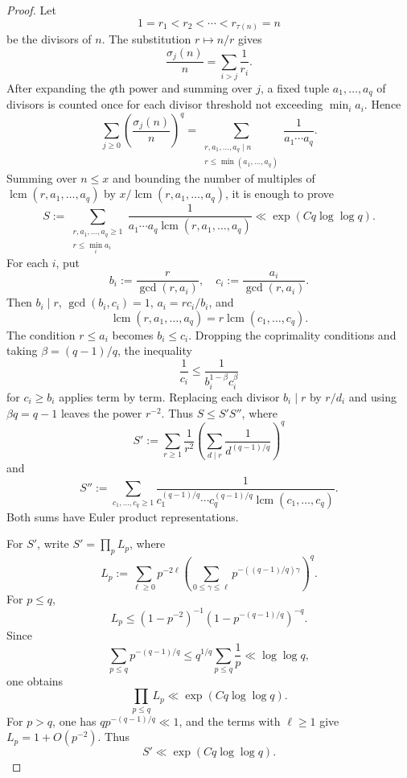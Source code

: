 \documentclass[11pt,letterpaper,reqno]{amsart}
\numberwithin{equation}{section}
\theoremstyle{remark}
\DeclareMathOperator{\lcm}{lcm}
\renewcommand{\leq}{\leqslant}
\renewcommand{\geq}{\geqslant}
\begin{document}
\begin{proof}
Let
\[
 1=r_1<r_2<\cdots<r_{\tau(n)}=n
\]
be the divisors of $n$. The substitution $r\mapsto n/r$ gives
\[
 \frac{\sigma_j(n)}n=\sum_{i>j}\frac1{r_i}.
\]
After expanding the $q$th power and summing over $j$, a fixed tuple
$a_1,\ldots,a_q$ of divisors is counted once for each divisor threshold not
exceeding $\min_i a_i$. Hence
\[
 \sum_{j\geq0}\left(\frac{\sigma_j(n)}n\right)^q
 =
 \sum_{\substack{r,a_1,\ldots,a_q\mid n\\
 r\leq\min(a_1,\ldots,a_q)}}
 \frac1{a_1\cdots a_q}.
\]
Summing over $n\leq x$ and bounding the number of multiples of
$\lcm(r,a_1,\ldots,a_q)$ by\linebreak
$x/\lcm(r,a_1,\ldots,a_q)$, it is enough to prove
\begin{equation}\label{eq:k-S}
 S:=\sum_{\substack{r,a_1,\ldots,a_q\geq1\\r\leq\min_i a_i}}
 \frac1{a_1\cdots a_q\lcm(r,a_1,\ldots,a_q)}
 \ll\exp(Cq\log\log q).
\end{equation}
For each $i$, put
\[
 b_i:=\frac r{\gcd(r,a_i)},\quad c_i:=\frac{a_i}{\gcd(r,a_i)}.
\]
Then $b_i\mid r$, $\gcd(b_i,c_i)=1$, $a_i=rc_i/b_i$, and
\[
 \lcm(r,a_1,\ldots,a_q)=r\lcm(c_1,\ldots,c_q).
\]
The condition $r\leq a_i$ becomes $b_i\leq c_i$. Dropping the coprimality
conditions and taking $\beta=(q-1)/q$, the inequality
\[
 \frac1{c_i}\leq\frac1{b_i^{1-\beta}c_i^\beta}
\]
for $c_i\geq b_i$ applies term by term. Replacing each divisor $b_i\mid r$ by $r/d_i$
and using $\beta q=q-1$ leaves the power $r^{-2}$. Thus
$S\leq S'S''$, where
\[
 S':=\sum_{r\geq1}\frac1{r^2}
 \left(\sum_{d\mid r}\frac1{d^{(q-1)/q}}\right)^q
\]
and
\[
 S'':=\sum_{c_1,\ldots,c_q\geq1}
 \frac1{c_1^{(q-1)/q}\cdots c_q^{(q-1)/q}\lcm(c_1,\ldots,c_q)}.
\]
Both sums have Euler product representations.

For $S'$, write $S'=\prod_pL_p$, where
\[
 L_p:=\sum_{\ell\geq0}p^{-2\ell}
 \left(\sum_{0\leq\gamma\leq\ell}
 p^{-((q-1)/q)\gamma}\right)^q.
\]
For $p\leq q$,
\[
 L_p\leq(1-p^{-2})^{-1}(1-p^{-(q-1)/q})^{-q}.
\]
Since
\[
 \sum_{p\leq q}p^{-(q-1)/q}
 \leq q^{1/q}\sum_{p\leq q}\frac1p
 \ll\log\log q,
\]
one obtains
\[
 \prod_{p\leq q}L_p\ll\exp(Cq\log\log q).
\]
For $p>q$, one has $qp^{-(q-1)/q}\ll1$, and the terms with $\ell\geq1$
give $L_p=1+O(p^{-2})$. Thus
\begin{equation}\label{eq:k-Sprime}
 S'\ll\exp(Cq\log\log q).
\end{equation}


\end{proof}
\end{document}
